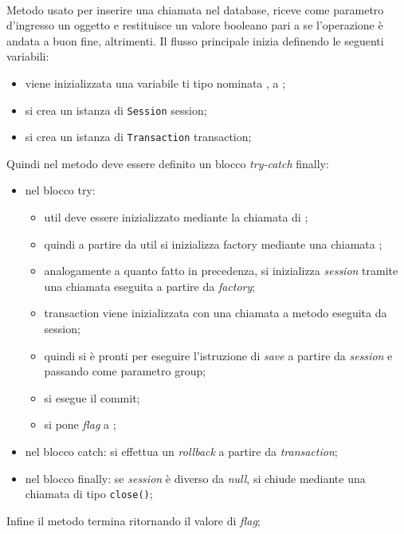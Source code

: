 \begin{description}
	\item{}\\
	Metodo usato per inserire una chiamata nel database, riceve come parametro d'ingresso un oggetto  e restituisce un valore booleano  pari a  se l'operazione è andata a buon fine,  altrimenti. Il flusso principale inizia definendo le seguenti variabili:
	\begin{itemize}
		\item viene inizializzata una variabile ti tipo  nominata , a ;
		\item si crea un istanza di \texttt{Session} session;
		\item si crea un istanza di \texttt{Transaction} transaction;
	\end{itemize}
	Quindi nel metodo deve essere definito un blocco \textit{try-catch} finally:
	\begin{itemize}
		\item nel blocco try:
		\begin{itemize}
			\item util deve essere inizializzato mediante la chiamata  di ;
			\item quindi a partire da util si inizializza factory mediante una chiamata ;
			\item analogamente a quanto fatto in precedenza, si inizializza \textit{session} tramite una chiamata  eseguita a partire da \textit{factory};
			\item transaction viene inizializzata con una chiamata a metodo  eseguita da session;
			\item quindi si è pronti per eseguire l'istruzione di \textit{save} a partire da \textit{session} e passando come parametro group;
			\item si esegue il commit;
			\item si pone \textit{flag} a ;
		\end{itemize}
		\item nel blocco catch: si effettua un \textit{rollback} a partire da \textit{transaction};
		\item nel blocco finally: se \textit{session} è diverso da \textit{null}, si chiude mediante una chiamata di tipo \texttt{close()};
	\end{itemize}
	Infine il metodo termina ritornando il valore di \textit{flag};
	

\end{description}
